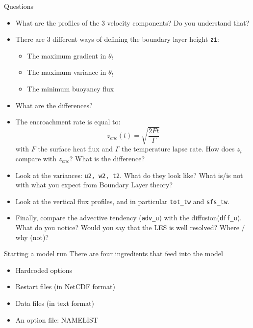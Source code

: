 \documentclass[handout]{beamer}
\newcommand{\code}[1]{{\tt #1}}
\begin{document}
\begin{frame}[allowframebreaks]{Questions}
 \begin{itemize}
  \item What are the profiles of the 3 velocity components? Do you understand that?
  \item There are 3 different ways of defining the boundary layer height \code{zi}:
\begin{itemize}
 \item The maximum gradient in $\theta_l$
 \item The maximum variance in $\theta_l$
 \item The minimum buoyancy flux
\end{itemize}
 \item What are the differences? 
 \item The encroachment rate is equal to: \[z_{enc}(t) = \sqrt{\frac{2 F t}{\Gamma}}\] with $F$ the surface heat flux and $\Gamma$ the temperature lapse rate. How does $z_i$ compare with $z_{enc}$? What is the difference?

 \item Look at the variances: \code{u2, w2, t2}. What do they look like? What is/is not with what you expect from Boundary Layer theory?
 \item Look at the vertical flux profiles, and in particular \code{tot\_tw} and \code{sfs\_tw}. 
 \item Finally, compare the advective tendency (\code{adv\_u}) with the diffusion(\code{dff\_u}). What do you notice? Would you say that the LES is well resolved? Where / why (not)?
 \end{itemize}
\end{frame}

\begin{frame}{Starting a model run}
There are four ingredients that feed into the model
\begin{itemize}
 \item Hardcoded options
 \item Restart files (in NetCDF format)
 \item Data files (in text format)
 \item An option file: NAMELIST
\end{itemize}
\end{frame}
\end{document}
